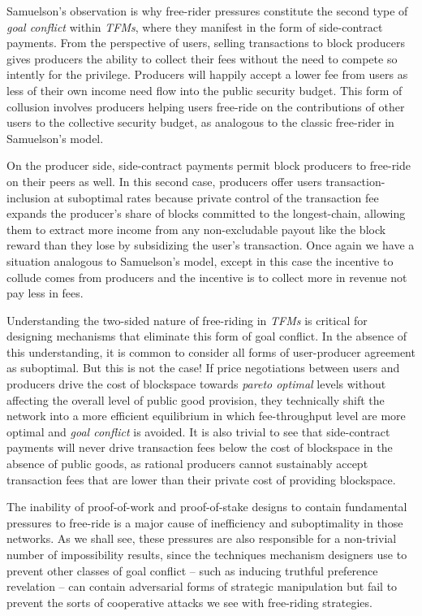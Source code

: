 Samuelson's observation is why free-rider pressures constitute the second type of \textit{goal conflict} within \textit{TFMs}, where they manifest in the form of side-contract payments. From the perspective of users, selling transactions to block producers gives producers the ability to collect their fees without the need to compete so intently for the privilege. Producers will happily accept a lower fee from users as less of their own income need flow into the public security budget. This form of collusion involves producers helping users free-ride on the contributions of other users to the collective security budget, as analogous to the classic free-rider in Samuelson's model.

On the producer side, side-contract payments permit block producers to free-ride on their peers as well. In this second case, producers offer users transaction-inclusion at suboptimal rates because private control of the transaction fee expands the producer's share of blocks committed to the longest-chain, allowing them to extract more income from any non-excludable payout like the block reward than they lose by subsidizing the user's transaction. Once again we have a situation analogous to Samuelson's model, except in this case the incentive to collude comes from producers and the incentive is to collect more in revenue not pay less in fees.

Understanding the two-sided nature of free-riding in \textit{TFMs} is critical for designing mechanisms that eliminate this form of goal conflict. In the absence of this understanding, it is common to consider all forms of user-producer agreement as suboptimal. But this is not the case! If price negotiations between users and producers drive the cost of blockspace towards \textit{pareto optimal} levels without affecting the overall level of public good provision, they technically shift the network into a more efficient equilibrium in which fee-throughput level are more optimal and \textit{goal conflict} is avoided. It is also trivial to see that side-contract payments will never drive transaction fees below the cost of blockspace in the absence of public goods, as rational producers cannot sustainably accept transaction fees that are lower than their private cost of providing blockspace. 

The inability of proof-of-work and proof-of-stake designs to contain fundamental pressures to free-ride is a major cause of inefficiency and suboptimality in those networks. As we shall see, these pressures are also responsible for a non-trivial number of impossibility results, since the techniques mechanism designers use to prevent other classes of goal conflict -- such as inducing truthful preference revelation -- can contain adversarial forms of strategic manipulation but fail to prevent the sorts of cooperative attacks we see with free-riding strategies.

